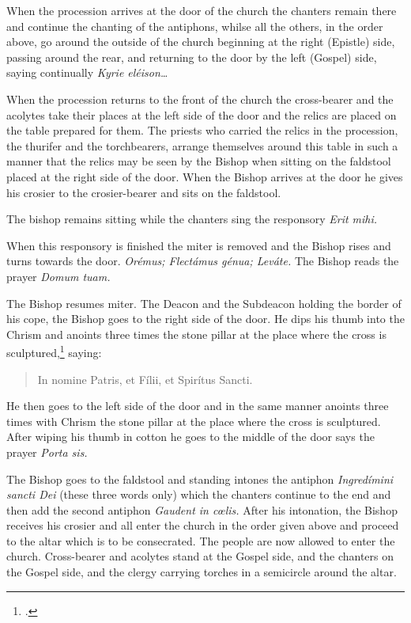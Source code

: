 \documentclass[letterpaper]{report}
\newcommand\src{\textsc{S.R.C.}}
\begin{document}
{    When the procession arrives at the door of the church the chanters remain
    there and continue the chanting of the antiphons, whilse all the others, in
    the order above, go around the outside of the church beginning at the right
    (Epistle) side, passing around the rear, and returning to the door by the
    left (Gospel) side, saying continually \textit{Kyrie eléison\dots}

    \rubric When the procession returns to the front of the church the
    cross-bearer and the acolytes take their places at the left side of the
    door and the relics are placed on the table prepared for them. The priests
    who carried the relics in the procession, the thurifer and the
    torchbearers, arrange themselves around this table in such a manner that
    the relics may be seen by the Bishop when sitting on the faldstool placed
    at the right side of the door. When the Bishop arrives at the door he gives
    his crosier to the crosier-bearer and sits on the faldstool.


    \rubric The bishop remains sitting while the chanters sing the responsory
    \textit{Erit mihi.}

    \rubric When this responsory is finished the miter is removed and the
    Bishop rises and turns towards the door. \textit{Orémus; Flectámus génua;
    Leváte.} The Bishop reads the prayer \textit{Domum tuam.}

    \rubric The Bishop resumes miter. The Deacon and the Subdeacon holding the
    border of his cope, the Bishop goes to the right side of the door. He dips
    his thumb into the Chrism and anoints three times the stone pillar at the
    place where the cross is sculptured,\footcite[The Pontifical says
    ''\textit{signat ostium,''} which the \src, Aug. 7, 1875, n. 3364 ad VI,
    interprets to mean the two stone or brick pillars at the sides of the
    door.][footnote 1, p. 83.]{consecranda} saying:

    \begin{quote}
       In nomine Pa\cross tris, et Fí\cross lii, et Spirítus \cross Sancti.
    \end{quote}

    He then goes to the left side of the door and in the same manner anoints three
    times with Chrism the stone pillar at the place where the cross is sculptured.
    After wiping his thumb in cotton he goes to the middle of the door says the
    prayer \textit{Porta sis.}

    \rubric The Bishop goes to the faldstool and standing intones the antiphon
    \textit{Ingred\'imini sancti Dei} (these three words only) which the
    chanters continue to the end and then add the second antiphon
    \textit{Gaudent in c\oe lis.} After his intonation, the Bishop receives his
    crosier and all enter the church in the order given above and proceed to
    the altar which is to be consecrated. The people are now allowed to enter
    the church. Cross-bearer and acolytes stand at the Gospel side, and the
    chanters on the Gospel side, and the clergy carrying torches
    in a semicircle around the altar. 

}
\end{document}
